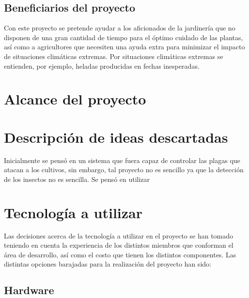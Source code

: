 \documentclass[runningheads]{llncs}
\begin{document}
    \subsection{Beneficiarios del proyecto}
    Con este proyecto se pretende ayudar a los aficionados de la jardinería que no disponen de una gran cantidad de tiempo para el óptimo cuidado de las plantas, así como a agricultores que necesiten una ayuda extra para minimizar el impacto de situaciones climáticas extremas. Por situaciones climáticas extremas se entienden, por ejemplo, heladas producidas en fechas inesperadas.
    
\section{Alcance del proyecto}

\section{Descripción de ideas descartadas}

Inicialmente se pensó en un sistema que fuera capaz de controlar las plagas que atacan a los cultivos, sin embargo, tal proyecto no es sencillo ya que la detección de los insectos no es sencilla. Se pensó en utilizar 

\section{Tecnología a utilizar}
Las decisiones acerca de la tecnología a utilizar en el proyecto se han tomado teniendo en cuenta la experiencia de los distintos miembros que conforman el área de desarrollo, así como el costo que tienen los distintos componentes.
\newline
Las distintas opciones barajadas para la realización del proyecto han sido:

\subsection*{Hardware}
\end{document}
